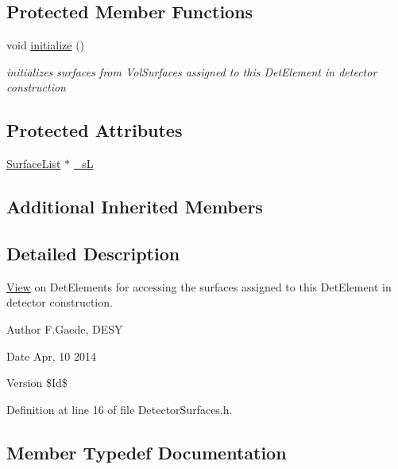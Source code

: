 \subsection*{Protected Member Functions}
\begin{DoxyCompactItemize}
\item 
void \hyperlink{class_d_d4hep_1_1_d_d_rec_1_1_detector_surfaces_a7db2dd282079291d6c99275db180fd81}{initialize} ()
\begin{DoxyCompactList}\small\item\em initializes surfaces from Vol\+Surfaces assigned to this Det\+Element in detector construction \end{DoxyCompactList}\end{DoxyCompactItemize}
\subsection*{Protected Attributes}
\begin{DoxyCompactItemize}
\item 
\hyperlink{class_d_d4hep_1_1_d_d_rec_1_1_surface_list}{Surface\+List} $\ast$ \hyperlink{class_d_d4hep_1_1_d_d_rec_1_1_detector_surfaces_ae6635879dddb6bd5dd2624c2e38f46a8}{\+\_\+sL}
\end{DoxyCompactItemize}
\subsection*{Additional Inherited Members}


\subsection{Detailed Description}
\hyperlink{class_d_d4hep_1_1_view}{View} on Det\+Elements for accessing the surfaces assigned to this Det\+Element in detector construction.

\begin{DoxyAuthor}{Author}
F.\+Gaede, D\+E\+SY 
\end{DoxyAuthor}
\begin{DoxyDate}{Date}
Apr, 10 2014 
\end{DoxyDate}
\begin{DoxyVersion}{Version}
\$\+Id\$ 
\end{DoxyVersion}


Definition at line 16 of file Detector\+Surfaces.\+h.



\subsection{Member Typedef Documentation}
\hypertarget{class_d_d4hep_1_1_d_d_rec_1_1_detector_surfaces_a1b81ef076a40865045f404fb3e360562}{}\label{class_d_d4hep_1_1_d_d_rec_1_1_detector_surfaces_a1b81ef076a40865045f404fb3e360562} 
